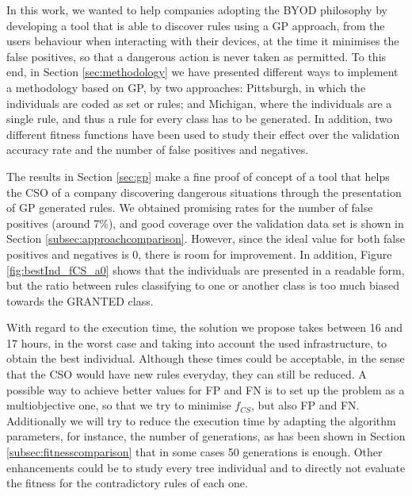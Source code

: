 \documentclass[runningheads]{llncs}
\begin{document}

In this work, we wanted to help companies adopting the BYOD philosophy
by developing a tool that is able to discover rules using a GP
approach, from the users behaviour when interacting with their
devices, at the time it minimises the false positives, so that a
dangerous action is never taken as permitted. To this end, in Section \ref{sec:methodology} we have
presented different ways to implement a methodology based on GP, by two
approaches: Pittsburgh, in which the individuals are coded as set or
rules; and Michigan, where the individuals are a single rule, and thus
a rule for every class has to be generated. In addition, two different
fitness functions have been used to study their effect over the
validation accuracy rate and the number of false positives and
negatives.

The results in Section \ref{sec:gp} make a fine proof of concept of a tool that helps the CSO of a company discovering dangerous situations through the presentation of GP generated rules. We obtained promising rates for the number of false positives (around
7\%), and good coverage over the validation data set is shown in
Section \ref{subsec:approachcomparison}. However, since the ideal
value for both false positives and negatives is 0, there is room for
improvement. In addition, Figure \ref{fig:bestInd_fCS_a0} shows
that the individuals are presented in a readable form, but the ratio
between rules classifying to one or another class is too much biased
towards the GRANTED class. %

With regard to the execution time, the solution we propose takes between 16 and 17 hours, in the worst case and taking into account the used infrastructure, to obtain the best individual. Although these times could be acceptable, in the sense that the CSO would have new rules everyday, they can still be reduced.  
A possible way to
achieve better values for FP and FN is to set up the problem as a
multiobjective one, so that we try to minimise $f_{CS}$, but also FP
and FN. Additionally we will try to reduce the execution time by adapting the algorithm parameters, for instance, the number of generations, as has been shown in Section \ref{subsec:fitnesscomparison} that in some cases 50 generations is enough. Other enhancements could be to study every tree individual and to directly not evaluate the fitness for the contradictory rules of each one. 
\end{document}
